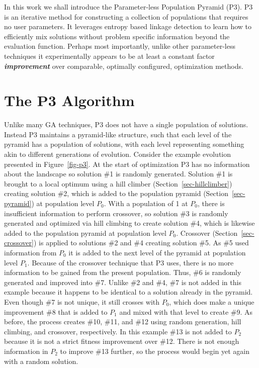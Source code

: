 \documentclass{sig-alternate}
\begin{document}
In this work we shall introduce the Parameter-less Population Pyramid
(P3).  P3 is an iterative method for constructing a collection of
populations that requires no user parameters.  It leverages entropy based
linkage detection to learn how to efficiently mix solutions without
problem specific information beyond the evaluation function.  Perhaps
most importantly, unlike other parameter-less techniques it
experimentally appears to be at least a constant factor
\emph{\textbf{improvement}} over comparable, optimally configured,
optimization methods.

\section{The P3 Algorithm}
\label{sec-p3}
Unlike many GA techniques, P3
does not have a single population of solutions.  Instead P3 maintains
a pyramid-like structure, such that each level of the pyramid has a
population of solutions, with each level representing something akin
to different generations of evolution. Consider the example evolution
presented in Figure~\ref{fig-p3}.  At the start of optimization P3
has no information about the landscape so solution \#1 is randomly generated.  Solution \#1
is brought to a local optimum using a hill climber
(Section~\ref{sec-hillclimber}) creating solution \#2, which is added
to the population pyramid (Section~\ref{sec-pyramid}) at population
level $P_0$.  With a population of 1 at $P_0$, there is insufficient information to perform crossover,
so solution \#3 is randomly generated and optimized via hill climbing
to create solution \#4, which is likewise added to the population
pyramid at population level $P_0$.
Crossover (Section~\ref{sec-crossover}) is applied to solutions \#2
and \#4 creating solution \#5. As \#5 used
information from $P_0$ it is added to the next level of the pyramid at
population level $P_1$.  Because of the crossover technique that P3
uses, there is no more information to be gained from the present
population. Thus, \#6 is randomly
generated and improved into \#7.  Unlike \#2 and \#4, \#7 is not added
in this example because it happens to be identical to a solution
already in the pyramid.  Even though \#7 is not unique, it still
crosses with $P_0$, which does make a unique improvement \#8 that is
added to $P_1$ and mixed with that level to create \#9.  As before,
the process creates \#10, \#11, and \#12 using random generation, hill
climbing, and crossover, respectively.  In this example \#13 is not
added to $P_2$ because it is not a strict fitness improvement over
\#12.  There is not enough information in $P_2$ to improve \#13
further, so the process would begin yet again with a random solution.
\end{document}
